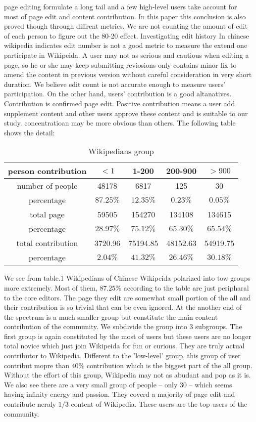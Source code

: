 \documentclass{elsarticle}
\begin{document}
page editing formulate a long tail and a few high-level users take
account for most of page edit and content contribution. In this paper
this conclusion is also proved though through diffrent metrics. We are
not counting the amount of edit of each person to figure out the 80-20
effect. Investigating edit history In chinese
wikipedia indicates edit number is not a good metric to measure the
extend one participate in Wikipeida. A user may not as serious and
cautious when editing a page, so  he or she may keep submitting reviosions
only contains  minor fix to amend the content in previous version
without careful consideration in very short
duration. We believe edit count is not accurate enough to measure
users' participation. On the other hand, users' contribution is a good
altanatives. Contribution is  confirmed page edit. Positive
contribution means a user add supplement content and other users
approve these content and is suitable to our study. concentratioan may be more obvious than others. The
following table shows the detail:

\begin{table}[h]
  \centering
  \caption{Wikipedians group}
  \begin{tabular}[center]{|c|c|c|c|c|}
    \hline
     person contribution& $< 1$&1-200&200-900&$>900$ \\\hline
    number of people&48178&6817&125&30 \\\hline
    percentage&$87.25\%$&$12.35\%$&$0.23\%$&$0.05\%$ \\\hline
    total page&59505&154270&134108&134615 \\\hline
    percentage&$28.97\%$&$75.12\%$&$65.30\%$&$65.54\%$ \\\hline
    total contribution&3720.96&75194.85&48152.63&54919.75 \\\hline
    percentage&$2.04\%$&$41.32\%$&$26.46\%$&$30.18\%$ \\\hline 
  \end{tabular}

\end{table}
We see from table.1 Wikipedians of Chinese Wikipeida polarized into
tow groups more extremely. Most of them, $87.25\%$ according to the
table are just  peripharal to the core editors. The page they edit are
somewhat small portion of the all and their contribution is so trivial
that can be even  ignored. At the another end of the spectrum is a
much  smaller group but constitute the main content contribution of
the community. We subdivide the group into 3 subgroups. The first
group is again constituted by the most of users but these users are no
longer total novice which just join Wikipeida for fun or curious. They
are truly actual contributor to Wikipedia. Different to the
'low-level' group, this group of user contribut mopre than $40\%$
contribution which is the biggest part of the all group. Without the
effort of this group, Wikipedia may not as abudant and pop as it
is. We also see there are a very small group of people -- only 30 --
which seems having   infinity energy and passion. They coverd a
majority of page edit and contribute neraly $1/3$ content of
Wikipedia. These users are the top users of the community.
\end{document}

